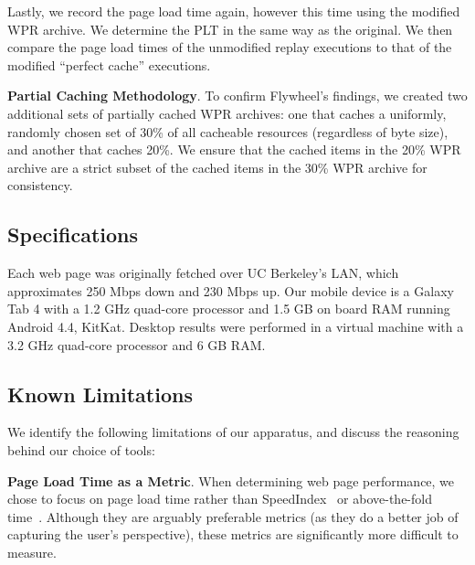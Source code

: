 Lastly, we record the page load time again, however this time using the modified WPR archive. We determine the PLT in the same way as the original. We then compare the page load times of the unmodified replay executions to that of the modified ``perfect cache'' executions.

\textbf{Partial Caching Methodology}. To confirm Flywheel's findings, we created two additional sets of partially cached WPR archives: one that caches a uniformly, randomly chosen set of 30\% of all cacheable resources (regardless of byte size), and another that caches 20\%.
We ensure that the cached items in the 20\% WPR archive are a strict subset of the cached items in the 30\% WPR archive for consistency. 
\subsection{Specifications} \label{specs}
Each web page was originally fetched over UC Berkeley's LAN, which approximates 250 Mbps down and 230 Mbps up.
Our mobile device is a Galaxy Tab 4 with a 1.2 GHz quad-core processor and 1.5 GB on board RAM running Android 4.4, KitKat. Desktop results were performed in a virtual machine with a 3.2 GHz quad-core processor and 6 GB RAM.
\subsection{Known Limitations}  \label{known_limitations}
We identify the following limitations of our apparatus, and discuss the reasoning behind our choice of tools:

\textbf{Page Load Time as a Metric}. When determining web page performance, we chose to focus on page load time rather than SpeedIndex~\cite{speed-index} or above-the-fold time~\cite{above-the-fold}.
Although they are arguably preferable metrics (as they do a better job of
capturing the user's perspective), these metrics are significantly more
difficult to measure.%

